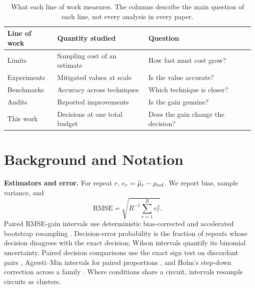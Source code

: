 \documentclass[10pt,twocolumn]{article}
\newcommand{\paragraphlead}[1]{\textbf{#1}\quad}
\begin{document}
\begin{table}[t]
\centering
\caption{What each line of work measures. The columns describe the main question of each line,
not every analysis in every paper.}
\label{tab:related}
\footnotesize
\setlength{\tabcolsep}{3pt}
\begin{tabular}{@{}p{}p{}p{}@{}}
\toprule
Line of work & Quantity studied & Question\\
\midrule
Limits \cite{takagi2022,takagi2023,quek2024} & Sampling cost of an estimate & How fast must cost grow?\\
Experiments \cite{kandala2019,kim2023} & Mitigated values at scale & Is the value accurate?\\
Benchmarks \cite{bultrini2021,cirstoiu2023} & Accuracy across techniques & Which technique is closer?\\
Audits \cite{koster2026} & Reported improvements & Is the gain genuine?\\
This work & Decisions at one total budget & Does the gain change the decision?\\
\bottomrule
\end{tabular}
\end{table}

\section{Background and Notation}
\label{sec:background}
\paragraphlead{Estimators and error.}
For repeat $r$, $e_r=\widehat\mu_r-\mu_{\rm ref}$. We report bias, sample variance, and
\begin{equation}
\mathrm{RMSE}=\sqrt{R^{-1}\textstyle\sum_{r=1}^{R}e_r^2}.
\end{equation}
Paired RMSE-gain intervals use deterministic bias-corrected and accelerated bootstrap resampling
\cite{efron1987}. Decision-error probability is the fraction of repeats whose decision disagrees with
the exact decision; Wilson intervals \cite{wilson1927} quantify its binomial uncertainty. Paired
decision comparisons use the exact sign test on discordant pairs \cite{mcnemar1947}, Agresti--Min
intervals for paired proportions \cite{agresti2005}, and Holm's step-down correction across a family
\cite{holm1979}. Where conditions share a circuit,
intervals resample circuits as clusters.
\end{document}
